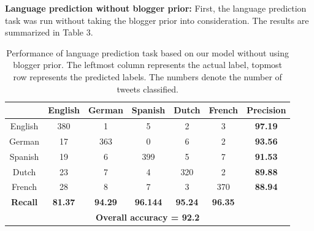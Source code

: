 \documentclass[11pt]{article}
\begin{document}
{\textbf {Language prediction without blogger prior: }}  First, the language prediction task was run without taking the blogger prior into consideration. The results are summarized in Table 3.

\begin{table}
\begin{center}
\small
\begin{tabular}{|c|c|c|c|c|c|c|}
\hline
\textbf{} & \textbf{English} & \textbf {German} & \textbf{Spanish} & \textbf{Dutch} & \textbf{French} & \textbf{Precision} \\
\hline
English    &        380       &       1          &        5         &       2        &        3        &      \textbf{97.19} \\
German     &         17       &     363          &        0         &       6        &        2        &      \textbf{93.56} \\
Spanish    &         19       &       6          &      399         &       5        &        7        &      \textbf{91.53} \\
Dutch      &         23       &       7          &        4         &     320        &        2        &      \textbf{89.88} \\
French     &         28       &       8          &        7         &       3        &      370        &      \textbf{88.94} \\
\hline
\textbf{Recall}&\textbf{81.37}& \textbf{94.29}   & \textbf{96.144}  & \textbf{95.24} & \textbf{96.35}  &      \textbf{} \\
\hline
\multicolumn{7}{|c|}{\textbf{Overall accuracy = 92.2}} \\\hline
\end{tabular}
\caption{\footnotesize Performance of language prediction task based on our model without using blogger prior. The leftmost column represents the actual label, topmost row represents the predicted labels. The numbers denote the number of tweets classified.}
\end{center}
\end{table}
\end{document}
